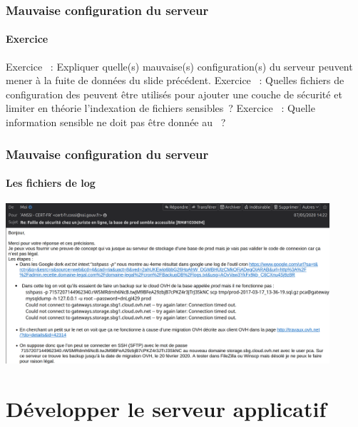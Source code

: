 \documentclass{beamer}
\begin{document}
    \begin{frame}
        \frametitle{Mauvaise configuration du serveur}
        \framesubtitle{Exercice}
        \transdissolve
        Exercice \execcounterdispinc{}~:
        Expliquer quelle(s) mauvaise(s) configuration(s) du serveur peuvent mener à la fuite de données du slide précédent.
        \bigbreak
        Exercice \execcounterdispinc{}~:
        Quelles fichiers de configuration des  peuvent être utilisés pour ajouter une couche de sécurité et limiter en théorie l'indexation de fichiers sensibles~?
        Exercice \execcounterdispinc{}~:
        Quelle information sensible ne doit pas être donnée au ~?
    \end{frame}

    \begin{frame}
        \frametitle{Mauvaise configuration du serveur}
        \framesubtitle{Les fichiers de log}
        \transdissolve
        \centering
        \includegraphics[width=12cm]{image/mail-anssi}
    \end{frame}


    \section{Développer le serveur applicatif}\label{sec:dev-serveur-applicatif}
\end{document}
